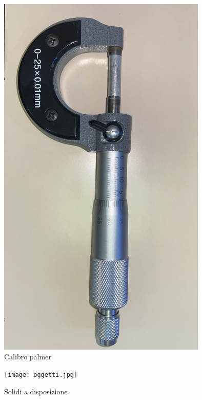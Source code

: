 \documentclass{article}
\begin{document}
\begin{enumerate}
\begin{figure}
    \centering
    \includegraphics[width = 10cm]{palmer.jpg}
    \caption{Calibro palmer}
    \label{fig:my_label}
\end{figure}

\begin{figure} [t]
    \centering
    \texttt{[image: oggetti.jpg]}
    \caption{Solidi a disposizione}
    \label{fig:my_label}
\end{figure}

\FloatBarrier


\end{enumerate}
\end{document}
